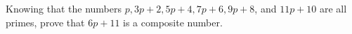Knowing that the numbers $p, 3p+2, 5p+4, 7p+6, 9p+8$, and $11p+10$ are all primes, prove that $6p+11$ is a composite number.